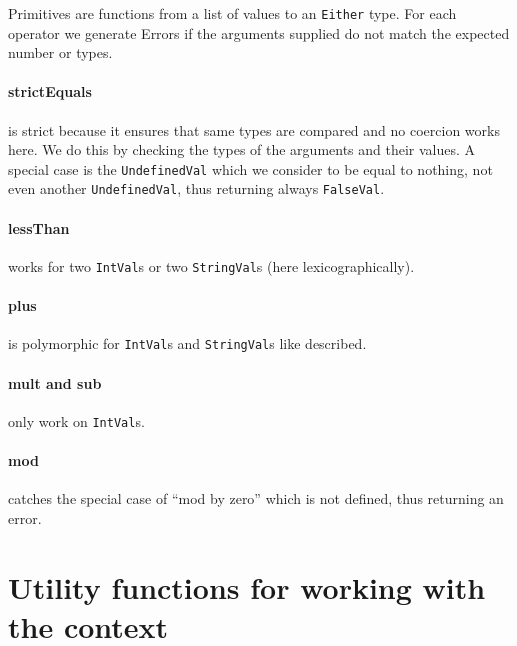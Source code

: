 \documentclass{article}
\begin{document}
Primitives are functions from a list of values to an \texttt{Either} type.
For each operator we generate Errors if the arguments supplied do not match the expected number or types.

\paragraph{strictEquals} is strict because it ensures that same types are compared and no coercion works here.
We do this by checking the types of the arguments and their values. A special case is the \texttt{UndefinedVal}
which we consider to be equal to nothing, not even another \texttt{UndefinedVal}, thus returning always \texttt{FalseVal}.

\paragraph{lessThan} works for two \texttt{IntVal}s or two \texttt{StringVal}s (here lexicographically).

\paragraph{plus} is polymorphic for \texttt{IntVal}s and \texttt{StringVal}s like described.

\paragraph{mult and sub} only work on \texttt{IntVal}s.

\paragraph{mod} catches the special case of ``mod by zero'' which is not defined, thus returning an error.


\section{Utility functions for working with the context}
\end{document}
